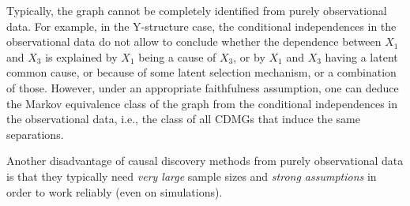 Typically, the graph cannot be completely identified from purely observational data.
For example, in the Y-structure case, the conditional independences in the observational data
do not allow to conclude whether the dependence between $X_1$ and $X_3$ is explained by
$X_1$ being a cause of $X_3$, or by $X_1$ and $X_3$ having a latent common cause,
or because of some latent selection mechanism, or a combination of those.
However, under an appropriate faithfulness assumption, one can deduce the Markov
equivalence class of the graph from the conditional independences in the observational data, 
i.e., the class of all CDMGs that induce the same separations.

Another disadvantage of causal discovery methods from purely observational data is that
they typically need \emph{very large} sample sizes and \emph{strong assumptions} in order to work reliably (even on simulations).

